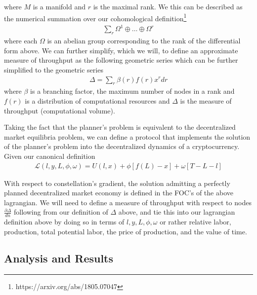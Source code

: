 \documentclass{article}
\begin{document}
where $M$ is a manifold and $r$ is the maximal rank. We this can be described as the numerical summation over our cohomological definition\footnote{https://arxiv.org/abs/1805.07047}
\begin{equation*} \label{eq1}
\begin{split}
\sum_{r} \Omega^1 \oplus \dots \oplus \Omega^r
\end{split}
\end{equation*}
where each $\Omega$ is an abelian group corresponding to the rank of the differential form above. We can further simplify, which we will, to define an approximate measure of throughput as the following geometric series 
which can be further simplified to the geometric series
\begin{equation*} \label{eq1}
\begin{split}
\Delta = \sum_{r} \beta(r) f(r) x^r dr
\end{split}
\end{equation*}
where $\beta$ is a branching factor, the maximum number of nodes in a rank and $f(r)$ is a distribution of computational resources and $\Delta$ is the measure of throughput (computational volume).

Taking the fact that the planner's problem is equivalent to the decentralized market equilibria problem, we can define a protocol that implements the solution of the planner's problem into the decentralized dynamics of a cryptocurrency. Given our canonical definition
\begin{equation*} \label{eq1}
\begin{split}
\mathcal{L}(l, y, L, \phi, \omega) = U(l, x) + \phi[f(L) - x] + \omega[T - L - l]
\end{split}
\end{equation*}

With respect to constellation's gradient, the solution admitting a perfectly planned decentralized market economy is defined in the FOC's of the above lagrangian. We will need to define a measure of throughput with respect to nodes $\frac{\partial \Delta}{dn}$ following from our definition of $\Delta$ above, and tie this into our lagrangian definition above by doing so in terms of $ l, y, L, \phi, \omega$ or rather relative labor, production, total potential labor, the price of production, and the value of time.

\subsection{Analysis and Results}



\end{document}
